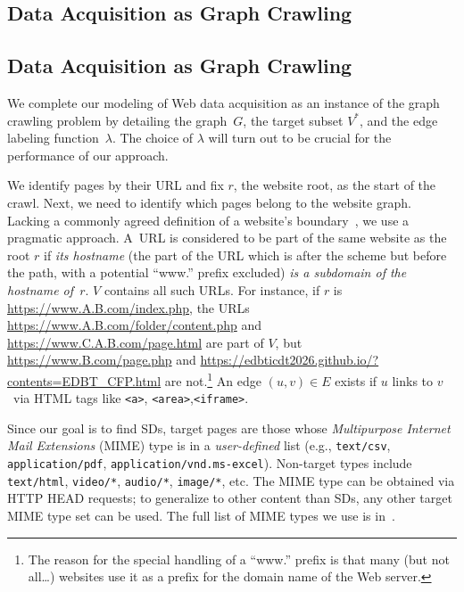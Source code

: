 \subsection{Data Acquisition as Graph Crawling}\label{section:graph_to_website}
\begin{toappendix}
	\subsection{Data Acquisition as Graph Crawling}
\end{toappendix}

We complete our modeling of Web data acquisition as an instance of the
graph crawling problem by detailing the graph~$G$, the target subset
$V^*$, and the edge labeling function~$\lambda$. The choice of $\lambda$ will turn out to be crucial for the performance of our approach.

We identify pages by their URL and fix $r$, the website root, as the start of the crawl.
Next, we need to identify which pages belong to the website graph. Lacking a commonly agreed definition of a website's boundary~\cite{senellart2005identifying,alshukri2010website}, we use a pragmatic approach. A~URL is considered to be part of the same website as the root $r$ if \emph{its hostname} (the part of the URL which is after the scheme but before the path, with a potential ``www.'' prefix excluded) \emph{is a subdomain of the hostname of~$r$}.
$V$ contains all such URLs. For instance, if $r$ is \url{https://www.A.B.com/index.php}, the URLs \url{https://www.A.B.com/folder/content.php} and \url{https://www.C.A.B.com/page.html} are part of $V$, but \url{https://www.B.com/page.php} and \url{https://edbticdt2026.github.io/?contents=EDBT_CFP.html} are not.\footnote{The reason for the special handling of a ``www.'' prefix is that many (but not all\dots) websites use it as a prefix for the domain name of the
	Web server.} An edge $(u,v) \in E$ exists if $u$ links to $v$~via HTML
tags like \texttt{<a>}, \texttt{<area>},\texttt{<iframe>}.

Since our goal is to find SDs,
target pages are those whose \emph{Multipurpose Internet Mail
	Extensions} (MIME) type is in a
\emph{user-defined} list (e.g., 
{\small\verb|text/csv|}, {\small\verb|application/pdf|},
{\small\verb|application/vnd.ms-excel|}).
Non-target types include {\small\verb|text/html|},
{\small\verb|video/*|}, {\small\verb|audio/*|}, {\small\verb|image/*|}, etc. 
The MIME type can be obtained via HTTP HEAD requests; to generalize to other content than SDs, 
any other target MIME type set can be used. The full list of MIME types
we use 
is in~\cite{github_repository}.

